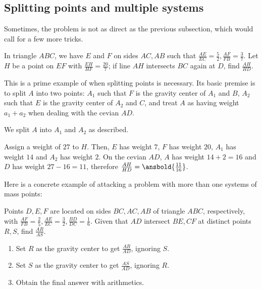 \documentclass{article}
\begin{document}
\subsection{Splitting points and multiple systems}
Sometimes, the problem is not as direct as the previous subsection, which would call for a few more tricks.
\begin{exam}
In triangle $ABC$, we have $E$ and $F$ on sides $AC,AB$ such that $\frac{AE}{EC}=\frac{5}{2},\frac{AF}{FB}=\frac{3}{7}$. Let $H$ be a point on $EF$ with $\frac{EH}{HF}=\frac{20}{7}$; if line $AH$ intersects $BC$ again at $D$, find $\frac{AH}{HD}$.
\end{exam}
This is a prime example of when splitting points is necessary. Its basic premise is to split $A$ into two points: $A_1$ such that $F$ is the gravity center of $A_1$ and $B$, $A_2$ such that $E$ is the gravity center of $A_2$ and $C$, and treat $A$ as having weight $a_1+a_2$ when dealing with the cevian $AD$.
\begin{sol}
We split $A$ into $A_1$ and $A_2$ as described. 

Assign a weight of $27$ to $H$. Then, $E$ has weight $7$, $F$ has weight $20$, $A_1$ has weight $14$ and $A_2$ has weight $2$. On the cevian $AD$, $A$ has weight $14+2=16$ and $D$ has weight $27-16=11$, therefore $\frac{AH}{HD}=\ansbold{\frac{11}{16}}$. 
\end{sol}

\bigskip
\noindent Here is a concrete example of attacking a problem with more than one systems of mass points:
\begin{exam}
Points $D,E,F$ are located on sides $BC,AC,AB$ of triangle $ABC$, respectively, with $\frac{AF}{FB}=\frac{2}{5},\frac{AE}{EC}=\frac{3}{2},\frac{BD}{DC}=\frac{1}{6}$. Given that $AD$ intersect $BE,CF$ at distinct points $R,S$, find $\frac{AR}{AS}$.
\end{exam}

\begin{walk}
\begin{enumerate}
\item Set $R$ as the gravity center to get $\frac{AR}{AD}$, ignoring $S$.
\item Set $S$ as the gravity center to get $\frac{AS}{AD}$, ignoring $R$.
\item Obtain the final answer with arithmetics.
\end{enumerate}
\end{walk}
\end{document}
